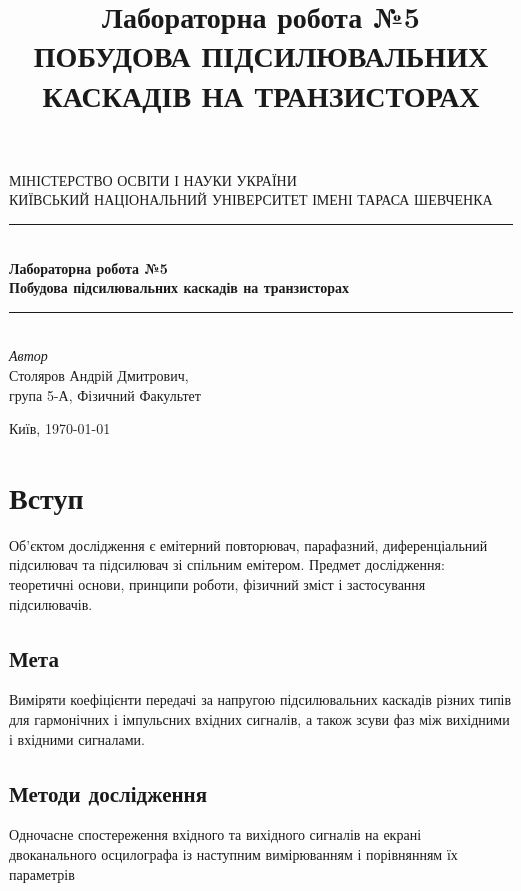 \documentclass[
  ukrainian,
  14pt
]{extreport}
\author{}
\title{\Huge Лабораторна робота №5 \\\Large ПОБУДОВА ПІДСИЛЮВАЛЬНИХ КАСКАДІВ НА
ТРАНЗИСТОРАХ}
\date{}
\begin{document}
\begin{titlepage} 
	\newcommand{\HRule}{\rule{\linewidth}{0.5mm}} 
	
	\center 
	
	\textsc{\Large МІНІСТЕРСТВО ОСВІТИ І НАУКИ УКРАЇНИ\\ \Large КИЇВСЬКИЙ НАЦІОНАЛЬНИЙ УНІВЕРСИТЕТ ІМЕНІ ТАРАСА ШЕВЧЕНКА}\\[1.5cm] 

	
	\HRule\\[0.4cm]
	
	{\huge \bfseries  Лабораторна робота №5 \\\Large \bfseries 
  Побудова підсилювальних каскадів на транзисторах
    }\\[0.4cm]
	
	\HRule\\[1.5cm]

	
	

	{\large\textit{Автор}}\\
	\large Столяров Андрій Дмитрович, \\\large група 5-А, Фізичний Факультет 
	
	
	\vfill\vfill\vfill 
	\vfill
	{\normalsize Київ, \today} 
\end{titlepage}
\tableofcontents
\clearpage
\section{Вступ}
Об'єктом дослідження є емітерний повторювач, парафазний, диференціальний
підсилювач та підсилювач зі спільним емітером.
Предмет дослідження: теоретичні основи, принципи роботи, фізичний зміст і
застосування підсилювачів.
\subsection{Мета}
Виміряти коефіцієнти передачі за напругою підсилювальних
каскадів різних типів для гармонічних і імпульсних вхідних сигналів, а також зсуви
фаз між вихідними і вхідними сигналами. 
\subsection{Методи дослідження}
Одночасне спостереження вхідного та вихідного сигналів
на екрані двоканального осцилографа із наступним вимірюванням і порівнянням їх
параметрів 
\end{document}

